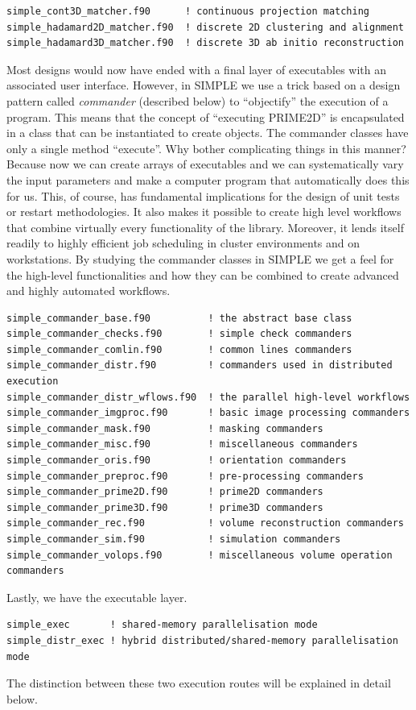 \documentclass[a4paper,11pt]{article}
\begin{document}
\begin{verbatim}
simple_cont3D_matcher.f90      ! continuous projection matching
simple_hadamard2D_matcher.f90  ! discrete 2D clustering and alignment
simple_hadamard3D_matcher.f90  ! discrete 3D ab initio reconstruction
\end{verbatim}
Most designs would now have ended with a final layer of executables with an associated user interface. However, in SIMPLE we use a trick based on a design pattern called \textit{commander} (described below) to ``objectify'' the execution of a program. This means that the concept of ``executing PRIME2D'' is encapsulated in a class that can be instantiated to create objects. The commander classes have only a single method ``execute''. Why bother complicating things in this manner? Because now we can create arrays of executables and we can systematically vary the input parameters and make a computer program that automatically does this for us. This, of course, has fundamental implications for the design of unit tests or restart methodologies. It also makes it possible to create high level workflows that combine virtually every functionality of the library. Moreover, it lends itself readily to highly efficient job scheduling in cluster environments and on workstations. By studying the commander classes in SIMPLE we get a feel for the high-level functionalities and how they can be combined to create advanced and highly automated workflows.
\begin{verbatim}
simple_commander_base.f90          ! the abstract base class
simple_commander_checks.f90        ! simple check commanders
simple_commander_comlin.f90        ! common lines commanders
simple_commander_distr.f90         ! commanders used in distributed execution
simple_commander_distr_wflows.f90  ! the parallel high-level workflows
simple_commander_imgproc.f90       ! basic image processing commanders
simple_commander_mask.f90          ! masking commanders
simple_commander_misc.f90          ! miscellaneous commanders
simple_commander_oris.f90          ! orientation commanders
simple_commander_preproc.f90       ! pre-processing commanders
simple_commander_prime2D.f90       ! prime2D commanders
simple_commander_prime3D.f90       ! prime3D commanders
simple_commander_rec.f90           ! volume reconstruction commanders
simple_commander_sim.f90           ! simulation commanders
simple_commander_volops.f90        ! miscellaneous volume operation commanders
\end{verbatim}
Lastly, we have the executable layer.
\begin{verbatim}
simple_exec       ! shared-memory parallelisation mode
simple_distr_exec ! hybrid distributed/shared-memory parallelisation mode 
\end{verbatim}
The distinction between these two execution routes will be explained in detail below.
\end{document}
